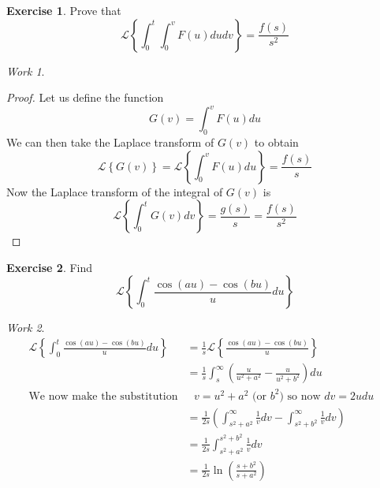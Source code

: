 \documentclass{report}
\theoremstyle{definition}
\newtheorem{exercise}{Exercise}[chapter]
\theoremstyle{remark}
\newtheorem*{work}{Work}
\newcommand{\lapt}[1]{\mathscr{L}\left\{ #1\right\}}
\newcommand{\pull}{\! \! \!}
\begin{document}
\begin{exercise}
    Prove that 
    \begin{equation*}
        \lapt{\int^t_0 \pull \int^v_0F(u)dudv} = \frac{f(s)}{s^2}
    \end{equation*}
\end{exercise}
\begin{work}
\leavevmode
\begin{proof}
    Let us define the function 
    \begin{equation*}
        G(v) = \int^v_0 F(u)du
    \end{equation*}
    We can then take the Laplace transform of $G(v)$ to obtain 
    \begin{equation*}
        \lapt{G(v)} = \lapt{\int^v_0 F(u)du} = \frac{f(s)}{s}
    \end{equation*}
    Now the Laplace transform of the integral of $G(v)$ is 
    \begin{equation*}
        \lapt{\int^t_0 G(v)dv} = \frac{g(s)}{s} = \frac{f(s)}{s^2}
    \end{equation*}
\end{proof}
\end{work}

\begin{exercise}
    Find 
    \begin{equation*}
        \lapt{\int^t_0 \frac{\cos(au) - \cos (bu)}{u}du}
    \end{equation*}
\end{exercise}
\begin{work}
    \begin{equation*}
        \begin{split}
            \lapt{\int^t_0 \frac{\cos(au) - \cos (bu)}{u}du} &= \frac{1}{s} \lapt{\frac{\cos(au) - \cos (bu)}{u}} \\
            &=\frac{1}{s} \int^\infty_s\left( \frac{u}{u^2+a^2} - \frac{u}{u^2+b^2} \right) du \\
            \text{We now make the substitution}&\text{ $v=u^2+a^2$ (or $b^2$) so now $dv = 2udu$ } \\
            &= \frac{1}{2s}\left( \int^\infty_{s^2+a^2}\frac{1}{v}dv - \int^\infty_{s^2+b^2}\frac{1}{v}dv\right)\\
            &=\frac{1}{2s}\int^{s^2+b^2}_{s^2+a^2}\frac{1}{v}dv \\
            &=\frac{1}{2s} \ln\left( \frac{s+b^2}{s+a^2} \right)
        \end{split}
    \end{equation*}
\end{work}
\end{document}
